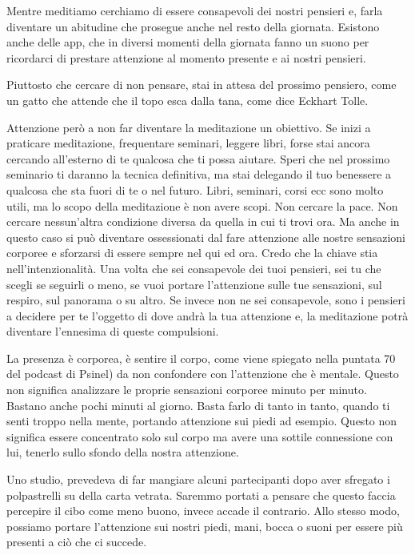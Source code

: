\documentclass[12pt]{book} %
\begin{document}
Mentre meditiamo cerchiamo di
essere consapevoli dei nostri pensieri e, farla diventare un abitudine che prosegue anche nel resto della giornata.
Esistono anche delle app, che in diversi momenti della giornata fanno un suono per ricordarci di prestare
attenzione al momento presente e ai nostri pensieri. 

Piuttosto che cercare di non pensare, stai in attesa del prossimo pensiero, come un gatto che attende che il topo esca dalla tana, come dice Eckhart Tolle.

Attenzione però a non far diventare la meditazione un obiettivo. Se inizi a praticare meditazione, frequentare seminari,
leggere libri, forse stai ancora cercando all'esterno di te qualcosa che ti
possa aiutare. Speri che nel prossimo seminario ti daranno la tecnica definitiva, ma stai delegando il tuo benessere a
qualcosa che sta fuori di te o nel futuro. Libri, seminari, corsi ecc sono molto utili, ma lo
scopo della meditazione è non avere scopi. Non cercare la pace. Non cercare nessun'altra
condizione diversa da quella in cui ti trovi ora. Ma anche in questo caso si può diventare ossessionati dal fare
attenzione alle nostre sensazioni corporee e sforzarsi di essere sempre nel qui ed ora. 
Credo che la chiave stia nell'intenzionalità. Una volta che sei
consapevole dei tuoi pensieri, sei tu che scegli se seguirli o meno, se vuoi portare l'attenzione
sulle tue sensazioni, sul respiro, sul panorama o su altro. Se invece non ne sei consapevole, sono i pensieri a
decidere per te l'oggetto di dove andrà la tua attenzione e, la meditazione potrà diventare l'ennesima di queste compulsioni.

La presenza è corporea, è sentire il corpo, come viene spiegato nella puntata
70 del podcast di Psinel) da non confondere con l'attenzione che è mentale. Questo non significa analizzare le proprie sensazioni corporee minuto
per minuto. Bastano anche pochi minuti al giorno. Basta farlo di tanto in tanto, quando ti senti troppo nella mente,
portando attenzione sui piedi ad esempio. Questo non significa essere concentrato solo sul corpo ma
avere una sottile connessione con lui, tenerlo sullo sfondo della nostra attenzione.

Uno studio, prevedeva di far mangiare alcuni partecipanti dopo aver sfregato i polpastrelli su della carta vetrata.
Saremmo portati a pensare che questo faccia percepire il cibo come meno buono, invece accade il contrario. Allo stesso
modo, possiamo portare l'attenzione sui nostri piedi, mani, bocca o suoni per essere più presenti a ciò che ci succede.
\end{document}
